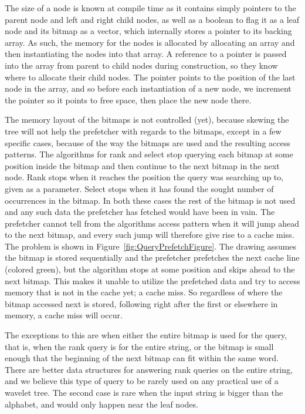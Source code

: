 The size of a node is known at compile time as it contains simply pointers to the parent node and left and right child nodes, as well as a boolean to flag it as a leaf node and its bitmap as a vector, which internally stores a pointer to its backing array.
As such, the memory for the nodes is allocated by allocating an array and then instantiating the nodes into that array.
A reference to a pointer is passed into the array from parent to child nodes during construction, so they know where to allocate their child nodes.
The pointer points to the position of the last node in the array, and so before each instantiation of a new node, we increment the pointer so it points to free space, then place the new node there.

The memory layout of the bitmaps is not controlled (yet), because skewing the tree will not help the prefetcher with regards to the bitmaps, except in a few specific cases, because of the way the bitmaps are used and the resulting access patterns.
The algorithms for rank and select stop querying each bitmap at some position inside the bitmap and then continue to the next bitmap in the next node.
Rank stops when it reaches the position the query was searching up to, given as a parameter.
Select stops when it has found the sought number of occurrences in the bitmap.
In both these cases the rest of the bitmap is not used and any such data the prefetcher has fetched would have been in vain.
The prefetcher cannot tell from the algorithms access pattern when it will jump ahead to the next bitmap, and every such jump will therefore give rise to a cache miss.
The problem is shown in Figure~\ref{fig:QueryPrefetchFigure}. The drawing assumes the bitmap is stored sequentially and the prefetcher prefetches the next cache line (colored green), but the algorithm stops at some position and skips ahead to the next bitmap. 
This makes it unable to utilize the prefetched data and try to access memory that is not in the cache yet; a cache miss.
So regardless of where the bitmap accessed next is stored, following right after the first or elsewhere in memory, a cache miss will occur.

The exceptions to this are when either the entire bitmap is used for the query, that is, when the rank query is for the entire string, or the bitmap is small enough that the beginning of the next bitmap can fit within the same word.
There are better data structures for answering rank queries on the entire string, and we believe this type of query to be rarely used on any practical use of a wavelet tree.
The second case is rare when the input string is bigger than the alphabet, and would only happen near the leaf nodes.

